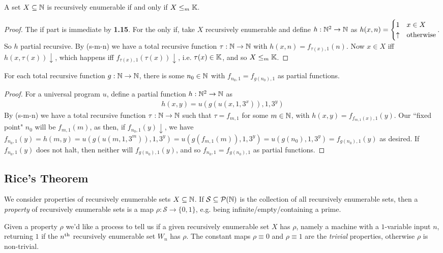\documentclass[10pt,a4paper]{article}
\begin{document}
\begin{theorem}
A set $X \subseteq \mathbb{N}$ is recursively enumerable if and only if $X\leq_m \mathbb{K}$.
\end{theorem}
\begin{proof}
The if part is immediate by \textbf{1.15}. For the only if, take $X$ recursively enumerable and define $h:\mathbb{N}^2 \to \mathbb{N}$ as $h(x,n) = \begin{cases}1 & x \in X \\ \uparrow & \text{otherwise} \end{cases}$. So $h$ partial recursive. By (s-m-n) we have a total recursive function $\tau:\mathbb{N} \to \mathbb{N}$ with $h(x,n) = f_{\tau(x),1}(n)$. Now $x\in X$ iff $h(x, \tau(x))\downarrow$, which happens iff $f_{\tau(x),1}(\tau(x))\downarrow$, i.e. $\tau(x) \in \mathbb{K}$, and so $X \leq_m \mathbb{K}$.
\end{proof}
\begin{theorem}
For each total recursive function $g:\mathbb{N} \to \mathbb{N}$, there is some $n_0 \in \mathbb{N}$ with $f_{n_0,1} = f_{g(n_0),1}$ as partial functions.
\end{theorem}
\begin{proof}
For a universal program $u$, define a partial function $h:\mathbb{N}^2 \to \mathbb{N}$ as 
\begin{align*}
h(x,y) = u(g(u(x,1,3^x)), 1, 3^y)
\end{align*}
By (s-m-n) we have a total recursive function $\tau:\mathbb{N}\to\mathbb{N}$ such that $\tau = f_{m,1}$ for some $m \in \mathbb{N}$, with $h(x,y) = f_{f_{m,1}(x),1}(y)$. Our ``fixed point" $n_0$ will be $f_{m,1}(m)$, as then, if $f_{n_0,1}(y)\downarrow$, we have $f_{n_0,1}(y) = h(m,y) = u(g(u(m,1,3^m)),1,3^y) = u(g(f_{m,1}(m)),1,3^y) = u(g(n_0),1,3^y) = f_{g(n_0),1}(y)$ as desired. If $f_{n_0,1}(y)$ does not halt, then neither will $f_{g(n_0),1}(y)$, and so $f_{n_0,1} = f_{g(n_0),1}$ as partial functions.
\end{proof}
\subsection*{Rice's Theorem}
We consider properties of recursively enumerable sets $X \subseteq \mathbb{N}$. If $\mathcal{S} \subseteq \mathcal{P}(\mathbb{N})$ is the collection of all recursively enumerable sets, then a \emph{property} of recursively enumerable sets is a map $\rho: \mathcal{S} \to \{0,1\}$, e.g. being infinite/empty/containing a prime. 

Given a property $\rho$ we'd like a process to tell us if a given recursively enumerable set $X$ has $\rho$, namely a machine with a $1$-variable input $n$, returning $1$ if the $n\textsuperscript{th}$ recursively enumerable set $W_n$ has $\rho$. The constant maps $\rho \equiv 0$ and $\rho \equiv 1$ are the \emph{trivial} properties, otherwise $\rho$ is non-trivial.
\end{document}
